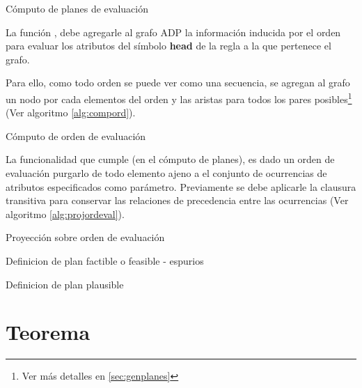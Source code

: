 \begin{algorithm}[!ht]

\caption{\label{alg:planeval} Cómputo de planes de evaluación}
\end{algorithm}

La función , debe agregarle al grafo ADP la información inducida por el orden para evaluar los atributos del símbolo \textbf{head} de la regla a la que pertenece el grafo.

Para ello, como todo orden se puede ver como una secuencia, se agregan al grafo un nodo por cada elementos del orden y las aristas para todos los pares posibles\footnote{Ver más detalles en \ref{sec:genplanes}} (Ver algoritmo \ref{alg:compord}).

\begin{algorithm}[!ht]

\caption{\label{alg:compord}Cómputo de orden de evaluación}
\end{algorithm}

La funcionalidad que cumple  (en el cómputo de planes), es dado un orden de evaluación purgarlo de todo elemento ajeno a el conjunto de ocurrencias de atributos especificados como parámetro. Previamente se debe aplicarle la clausura transitiva para conservar las relaciones de precedencia entre las ocurrencias (Ver algoritmo \ref{alg:projordeval}).

\begin{algorithm}[!ht]

\caption{\label{alg:projordeval} Proyección sobre orden de evaluación}
\end{algorithm}



\begin{definition}
\label{def:plan_espurios}
 Definicion de plan factible o feasible - espurios
\end{definition}

\begin{definition}
\label{def:plan_plausible}
 Definicion de plan plausible
\end{definition}




\section{Teorema}

